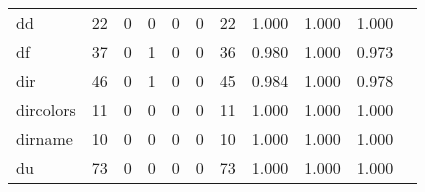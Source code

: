 \begin{longtable}{lp{1.2cm}p{1.2cm}p{1.2cm}p{1.2cm}p{1.2cm}p{1.2cm}p{1.2cm}p{1.2cm}p{1.2cm}p{1.2cm}}
dd        &                                    22 &                                                  0 &                                                  0 &                                                  0 &                                                  0 &                                                 22 &                                         1.000 &                                              1.000 &                                              1.000 \\
df        &                                    37 &                                                  0 &                                                  1 &                                                  0 &                                                  0 &                                                 36 &                                         0.980 &                                              1.000 &                                              0.973 \\
dir       &                                    46 &                                                  0 &                                                  1 &                                                  0 &                                                  0 &                                                 45 &                                         0.984 &                                              1.000 &                                              0.978 \\
dircolors &                                    11 &                                                  0 &                                                  0 &                                                  0 &                                                  0 &                                                 11 &                                         1.000 &                                              1.000 &                                              1.000 \\
dirname   &                                    10 &                                                  0 &                                                  0 &                                                  0 &                                                  0 &                                                 10 &                                         1.000 &                                              1.000 &                                              1.000 \\
du        &                                    73 &                                                  0 &                                                  0 &                                                  0 &                                                  0 &                                                 73 &                                         1.000 &                                              1.000 &                                              1.000 \\

\end{longtable}
